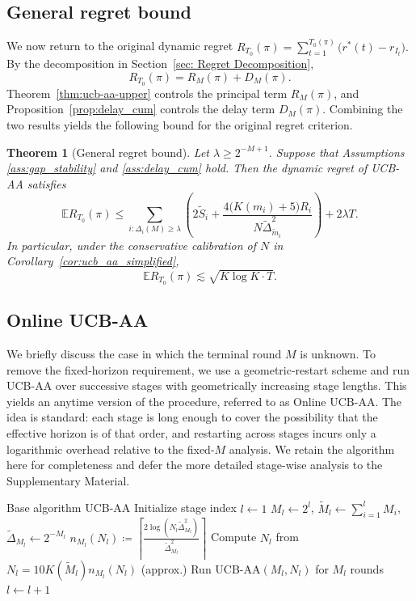 \documentclass[
  12pt]{article}
\newtheorem{theorem}{Theorem}
\begin{document}
\subsection{General regret bound}

We now return to the original dynamic regret
\(
R_{T_0}(\pi)
=
\sum_{t=1}^{T_0(\pi)}\bigl(r^*(t)-r_{I_t}\bigr).
\)
By the decomposition in Section~\ref{sec: Regret Decomposition},
\[
R_{T_0}(\pi)=R_M(\pi)+D_M(\pi).
\]
Theorem~\ref{thm:ucb-aa-upper} controls the principal term \(R_M(\pi)\), and Proposition~\ref{prop:delay_cum} controls the delay term \(D_M(\pi)\). Combining the two results yields the following bound for the original regret criterion.

\begin{theorem}[General regret bound]
\label{thm:general bound}
Let 
\(
\lambda \ge 2^{-M+1}.
\)
Suppose that Assumptions \ref{ass:gap_stability} and \ref{ass:delay_cum} hold. Then the dynamic regret of UCB-AA satisfies
\[
\mathbb{E} R_{T_0}(\pi)
\le
\sum_{i:\Delta_i(M)\ge \lambda}
\left(
2\tilde S_i+
\frac{4\bigl(K(m_i)+5\bigr)R_i}{N\tilde\Delta_{\tilde m_i}^2}
\right)
+2\lambda T .
\]
In particular, under the conservative calibration of $N$ in Corollary~\ref{cor:ucb_aa_simplified},
\[
\mathbb{E}R_{T_0}(\pi)\lesssim \sqrt{K\log K\cdot T}.
\]
\end{theorem}

\subsection{Online UCB-AA}
\label{sec:online}

We briefly discuss the case in which the terminal round \(M\) is unknown. To remove the fixed-horizon requirement, we use a geometric-restart scheme and run UCB-AA over successive stages with geometrically increasing stage lengths. This yields an anytime version of the procedure, referred to as Online UCB-AA. The idea is standard: each stage is long enough to cover the possibility that the effective horizon is of that order, and restarting across stages incurs only a logarithmic overhead relative to the fixed-\(M\) analysis. We retain the algorithm here for completeness and defer the more detailed stage-wise analysis to the Supplementary Material.

\begin{algorithm}[htbp]
\caption{Online UCB-AA}
\label{alg:online-ucb-aa}
\begin{algorithmic}[1]
\Require Base algorithm UCB-AA
\State Initialize stage index $l \leftarrow 1$
    \State $M_l\leftarrow2^l$, $\tilde{M}_l\leftarrow\sum_{i=1}^l M_i$, $\tilde{\Delta}_{M_l}\leftarrow2^{-M_l}$
    \State $n_{M_l}(N_l)\coloneqq\left\lceil\frac{2\log(N_l\tilde{\Delta}_{M_l}^2)}{\tilde{\Delta}_{M_l}^2}\right\rceil$
    \State Compute $N_l$ from $N_l=10K(\tilde{M}_l)n_{M_l}(N_l)$ (approx.)
    \State Run UCB-AA$(M_l,N_l)$ for $M_l$ rounds
    \State $l \leftarrow l+1$
\EndWhile
\end{algorithmic}
\end{algorithm}
\end{document}

